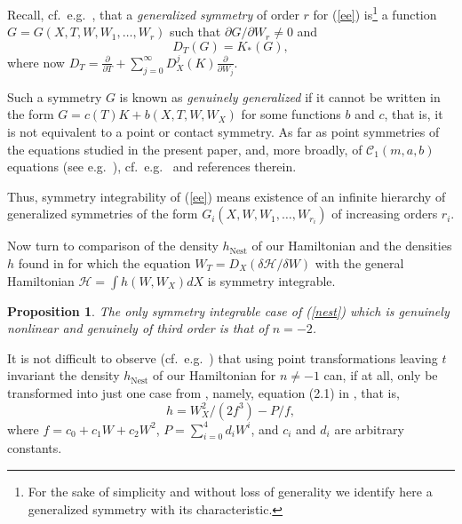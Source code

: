 \documentclass[12pt]{article}
\newtheorem{pro}{Proposition}
\begin{document}
Recall, cf.\ e.g.\ \cite{Ibragimov, mikshab, Olver, Dorfman}, that a {\em generalized symmetry} of order $r$ for (\ref{ee}) is\footnote{For the sake of simplicity and without loss of generality we identify here a generalized symmetry with its characteristic.}
a function $G=G(X,T,W,W_1,\dots,\allowbreak W_r)$ such that $\partial G/\partial W_r\neq 0$ and
\begin{equation}\label{symm}
D_T(G)=K_*(G),
\end{equation}
where now $D_T=\displaystyle\frac{\partial}{\partial T}+\sum\limits_{j=0}^\infty D_X^{j}(K)\displaystyle\frac{\partial}{\partial W_j}$.

Such a symmetry $G$ is known as {\em genuinely generalized} if it cannot be written in the form $G=c(T)K+b(X,T,W,W_X)$ for some functions $b$ and $c$, that is, it is not equivalent to a point or contact symmetry. As far as point symmetries of the equations studied in the present paper, and, more broadly, of $\mathcal{C}_1(m,a,b)$ equations (see e.g.\ \cite{Rosenau_06, Rosenau17}), cf.\ e.g.\ \cite{Tracina} and references therein.

Thus, symmetry integrability of (\ref{ee})
means existence of an infinite hierarchy of generalized symmetries of the form $G_i(X,W,W_1,\dots,W_{r_i})$ of increasing orders $r_i$.

Now turn to comparison of the density $h_{\mathrm{Nest}}$ of our Hamiltonian and the densities $h$ found in \cite{ms} for which the equation $W_T=D_X(\delta\mathcal{H}/\delta W)$
with the general Hamiltonian $\mathcal{H}=\displaystyle\int h(W,W_X)dX$ is symmetry integrable. %

\begin{pro}\label{sym-int}
The only symmetry integrable case of (\ref{nest}) which is genuinely nonlinear and genuinely of third order is that of $n=-2$.
\end{pro}

It is not difficult to observe (cf.\ e.g.\ \cite{vps}) that using point transformations leaving $t$ invariant the density $h_{\mathrm{Nest}}$ of our Hamiltonian for $n\neq -1$ can, if at all, only be transformed into just one case from \cite{ms}, namely, equation (2.1) in \cite{ms}, that is,
\begin{equation}\label{hms}
h=W_X^2/(2 f^3)-P/f,
\end{equation}
where $f=c_0+c_1 W +c_2 W^2$, $P=\sum\limits_{i=0}^4 d_i W^i$, and $c_i$ and $d_i$ are arbitrary constants.
\end{document}
